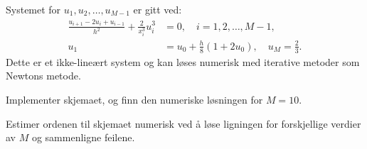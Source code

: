 Systemet for $u_1, u_2, \ldots, u_{M-1}$ er gitt ved:
\begin{align}
    \frac{u_{i+1} - 2u_i + u_{i-1}}{h^2} + \frac{2}{x_i^3} u_i^3 & = 0, \quad i = 1, 2, \ldots, M-1,                       \\
    u_1                                                          & = u_0 + \frac{h}{8}(1 + 2u_0), \quad u_M = \frac{2}{3}.
\end{align}
Dette er et ikke-lineært system og kan løses numerisk med iterative metoder som Newtons metode.

\subitem[(c)] Implementer skjemaet, og finn den numeriske løsningen for \( M = 10 \).


\subitem[(d)] Estimer ordenen til skjemaet numerisk ved å løse ligningen for forskjellige verdier av \( M \) og sammenligne feilene.





